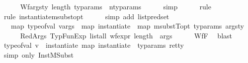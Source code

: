 \begin{isabellebody}
\ \ \ \ \isamarkupfalse%
\ Wf{\isacharunderscore}{\kern0pt}args{\isacharunderscore}{\kern0pt}ty\ {\isacartoucheopen}length\ ty{\isacharunderscore}{\kern0pt}params\ {\isacharequal}{\kern0pt}\ n{\isacharunderscore}{\kern0pt}ty{\isacharunderscore}{\kern0pt}params{\isacartoucheclose}\isanewline
\ \ \ \ \isamarkupfalse%
\ simp\isanewline
\ \ \ \ \isamarkupfalse%
\ rule\isanewline
\ \ \ \ \isamarkupfalse%
\ {\isacharparenleft}{\kern0pt}rule\ instantiate{\isacharunderscore}{\kern0pt}msubst{\isacharunderscore}{\kern0pt}opt{\isacharparenright}{\kern0pt}\isanewline
\ \ \ \ \isamarkupfalse%
\ {\isacharparenleft}{\kern0pt}simp\ add{\isacharcolon}{\kern0pt}\ list{\isachardot}{\kern0pt}pred{\isacharunderscore}{\kern0pt}set{\isacharparenright}{\kern0pt}\ \ \ \isanewline
\ \ \isamarkupfalse%
\isanewline
\ \ \ {\isachardoublequoteopen}map\ {\isacharparenleft}{\kern0pt}type{\isacharunderscore}{\kern0pt}of{\isacharunderscore}{\kern0pt}val{\isacharparenright}{\kern0pt}\ vargs\ {\isacharequal}{\kern0pt}\ {\isacharparenleft}{\kern0pt}map\ {\isacharparenleft}{\kern0pt}instantiate\ {\isasymOmega}{\isacharparenright}{\kern0pt}\ {\isacharparenleft}{\kern0pt}map\ {\isacharparenleft}{\kern0pt}msubstT{\isacharunderscore}{\kern0pt}opt\ ty{\isacharunderscore}{\kern0pt}params{\isacharparenright}{\kern0pt}\ args{\isacharunderscore}{\kern0pt}ty{\isacharparenright}{\kern0pt}{\isacharparenright}{\kern0pt}{\isachardoublequoteclose}\isanewline
\ \ \ \ \isamarkupfalse%
\ RedArgs\ TypFunExp\ {\isacartoucheopen}list{\isacharunderscore}{\kern0pt}all\ {\isacharparenleft}{\kern0pt}wf{\isacharunderscore}{\kern0pt}expr\ {\isacharparenleft}{\kern0pt}length\ {\isasymOmega}{\isacharparenright}{\kern0pt}{\isacharparenright}{\kern0pt}\ args{\isacartoucheclose}\isanewline
\ \ \ \ \isamarkupfalse%
\ Wf{\isacharunderscore}{\kern0pt}F\ \isamarkupfalse%
\ blast\ \isanewline
\ \ \isamarkupfalse%
\ {\isachardoublequoteopen}type{\isacharunderscore}{\kern0pt}of{\isacharunderscore}{\kern0pt}val\ v\ {\isacharequal}{\kern0pt}\ instantiate\ {\isacharparenleft}{\kern0pt}map\ {\isacharparenleft}{\kern0pt}instantiate\ {\isasymOmega}{\isacharparenright}{\kern0pt}\ ty{\isacharunderscore}{\kern0pt}params{\isacharparenright}{\kern0pt}\ ret{\isacharunderscore}{\kern0pt}ty{\isachardoublequoteclose}\isanewline
\ \ \ \ \isamarkupfalse%
\ {\isacharparenleft}{\kern0pt}simp\ only{\isacharcolon}{\kern0pt}\ InstMSubst{\isacharparenright}{\kern0pt}\isanewline

\end{isabellebody}
